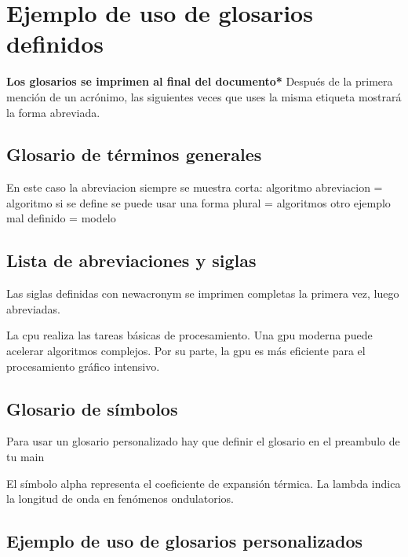  \section{Ejemplo de uso de glosarios definidos}

 \textbf{Los glosarios se imprimen al final del documento*}
 Después de la primera mención de un acrónimo,
 las siguientes veces que uses la misma etiqueta mostrará la forma abreviada. 
 \subsection{Glosario de términos generales}
 
 
 En este caso la abreviacion siempre se muestra corta:
 algoritmo abreviacion = \gls{algoritmo} 
 si se define se puede usar una forma plural =  \glspl{algoritmo}  
 otro  ejemplo mal definido = \gls{modelo} 
 
 \subsection{Lista de abreviaciones y siglas}
 
 Las siglas definidas con newacronym se imprimen completas la primera vez, luego abreviadas.
 
 La \gls{cpu} realiza las tareas básicas de procesamiento.  
 Una \gls{gpu} moderna puede acelerar algoritmos complejos.
 Por su parte, la \gls{gpu} es más eficiente para el procesamiento gráfico intensivo.  
 
 \subsection{Glosario de símbolos}
  
 Para usar  un glosario personalizado hay que definir el glosario en el preambulo de tu main 

 El símbolo \gls{alpha} representa el coeficiente de expansión térmica.  
 La \gls{lambda} indica la longitud de onda en fenómenos ondulatorios.
 
 \subsection{Ejemplo de uso de glosarios personalizados}
 
